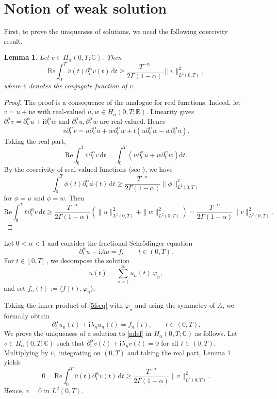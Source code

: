 \documentclass[reqno]{amsart}
\newtheorem{lem}[theorem]{Lemma}
\numberwithin{equation}{section}
\def \d {\mathrm{d}}
\begin{document}
\section{Notion of weak solution} \label{sec4}

First, to prove the uniqueness of solutions, we need the following coercivity result.
\begin{lem}\label{coer}
Let $v\in  H_{\alpha}(0,T;\mathbb{C})$. Then
$$\mathrm{Re} \int_0^T \overline{v}(t) \partial_t^\alpha v(t)\,\d t \ge \frac{T^{-\alpha}}{2\Gamma(1-\alpha)} \|v\|^2_{L^2(0,T)},$$
where $\overline{v}$ denotes the conjugate function of $v$.
\end{lem}
\begin{proof}
The proof is a consequence of the analogue for real functions. Indeed, let $v=u+\mathrm{i} w$ with real-valued $u, w \in H_{\alpha}(0,T;\mathbb{R})$. Linearity gives $\partial_t^\alpha v=\partial_t^\alpha u+\mathrm{i} \partial_t^\alpha w$ and $\partial_t^\alpha u, \partial_t^\alpha w$ are real-valued. Hence
$$
\overline{v} \partial_t^\alpha v=u \partial_t^\alpha u+w \partial_t^\alpha w+\mathrm{i}\left(u \partial_t^\alpha w-w \partial_t^\alpha u\right).
$$
Taking the real part,
$$
\mathrm{Re} \int_0^T \overline{v} \partial_t^\alpha v\, \d t=\int_0^T\left(u \partial_t^\alpha u+w \partial_t^\alpha w\right) \d t.
$$
By the coercivity of real-valued functions (see \cite[Theorem 3.1~(ii)]{KRY20}), we have
$$
\int_0^T \phi(t) \partial_t^\alpha \phi(t)\, \d t \geq \frac{T^{-\alpha}}{2\Gamma(1-\alpha)}\|\phi\|_{L^2(0, T)}^2
$$
for $\phi=u$ and $\phi=w$. Then
$$
\mathrm{Re} \int_0^T \overline{v} \partial_t^\alpha v\, \d t \geq \frac{T^{-\alpha}}{2\Gamma(1-\alpha)}\left(\|u\|_{L^2(0,T)}^2+\| w \|_{L^2(0,T)}^2\right)=\frac{T^{-\alpha}}{2\Gamma(1-\alpha)}\|v\|_{L^2(0,T)}^2 .
$$
\end{proof}

Let $0<\alpha<1$ and consider the fractional Schrödinger equation
\begin{equation}\label{fseq}
\partial_t^\alpha u -\mathrm{i} Au=f, \qquad t \in (0,T).
\end{equation}
For $t\in[0,T]$, we decompose the solution
\begin{equation*}
u(t)=\sum_{n=1}^\infty u_n(t)\,\varphi_n,
\end{equation*}
and set $f_n(t):=\langle f(t),\varphi_n\rangle$.

Taking the inner product of \eqref{5fseq} with $\varphi_n$ and using the symmetry of $A$, we formally obtain
\begin{equation}\label{odef}
\partial^{\alpha}_{t} u_n(t)+\mathrm{i}\lambda_n u_n(t)=f_n(t), \qquad t\in (0,T).
\end{equation}
We prove the uniqueness of a solution to \eqref{odef} in $H_{\alpha}(0,T;\mathbb{C})$ as follows. Let $v\in H_{\alpha}(0,T;\mathbb{C})$ such that $\partial_t^\alpha v(t) + \mathrm{i} \lambda_{n}v(t) = 0$ for all $t\in(0,T)$. Multiplying by $\overline{v},$ integrating on $(0,T)$ and taking the real part, Lemma \ref{coer} yields
$$0=\mathrm{Re} \int_0^T \overline{v}(t) \partial_t^\alpha v(t)\, \d t \ge \frac{T^{-\alpha}}{2\Gamma(1-\alpha)} \|v\|^2_{L^2(0,T)}.$$
Hence, $v=0$ in $L^2(0,T)$.
\end{document}
